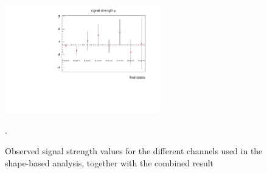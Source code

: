 \begin{figure}[hbt]
\begin{center}
\includegraphics[width=0.60\textwidth]{figures/mu_allchannels.pdf}
\caption{\label{fig:mu_allchannels} Observed signal strength values for the 
different channels used in the shape-based analysis, together with the 
combined result}.
\end{center}
\end{figure}
